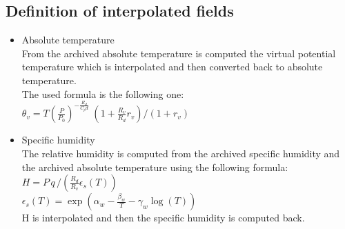 \subsection{Definition of interpolated fields}
\begin{itemize}
\item Absolute temperature\\
From the archived absolute temperature is computed the virtual potential temperature
which is interpolated and then converted back to absolute temperature.\\
The used formula is the following one:\\
$\theta_v = T ( \frac{P}{P_0})^{-\frac{R_d}{C_pd}}
\; (1+\frac{R_v}{R_d}r_v)/(1+r_v)$

\item Specific humidity\\
The relative humidity is computed from the archived specific humidity and the archived
absolute temperature using the following formula:\\
$H=P\,q \, / ( \frac{R_d}{R_v}\epsilon_s(T) )$\\
$\epsilon_s(T)=\exp ( \alpha_w-\frac{\beta_w}{T}-\gamma_w\log(T) )$\\
H is interpolated and then the specific humidity is computed back.


\end{itemize}
